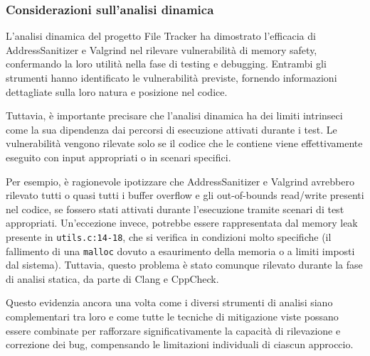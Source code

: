 \subsubsection*{Considerazioni sull'analisi dinamica}
L'analisi dinamica del progetto File Tracker ha dimostrato l'efficacia di AddressSanitizer
e Valgrind nel rilevare vulnerabilità di memory safety, confermando la loro
utilità nella fase di testing e debugging. Entrambi gli strumenti hanno identificato
le vulnerabilità previste, fornendo informazioni dettagliate sulla loro natura e
posizione nel codice.

Tuttavia, è importante precisare che l'analisi dinamica ha dei limiti intrinseci
come la sua dipendenza dai percorsi di esecuzione attivati durante i test. Le
vulnerabilità vengono rilevate solo se il codice che le contiene viene
effettivamente eseguito con input appropriati o in scenari specifici.

Per esempio, è ragionevole ipotizzare che AddressSanitizer e Valgrind avrebbero rilevato
tutti o quasi tutti i buffer overflow e gli out-of-bounds read/write presenti nel
codice, se fossero stati attivati durante l'esecuzione tramite scenari di test
appropriati. Un'eccezione invece, potrebbe essere rappresentata dal memory leak
presente in \texttt{utils.c:14-18}, che si verifica in condizioni molto
specifiche (il fallimento di una \texttt{malloc} dovuto a esaurimento della
memoria o a limiti imposti dal sistema). Tuttavia, questo problema è stato comunque
rilevato durante la fase di analisi statica, da parte di Clang e CppCheck.

Questo evidenzia ancora una volta come i diversi strumenti di analisi siano
complementari tra loro e come tutte le tecniche di mitigazione viste possano
essere combinate per rafforzare significativamente la capacità di rilevazione e
correzione dei bug, compensando le limitazioni individuali di ciascun approccio.
